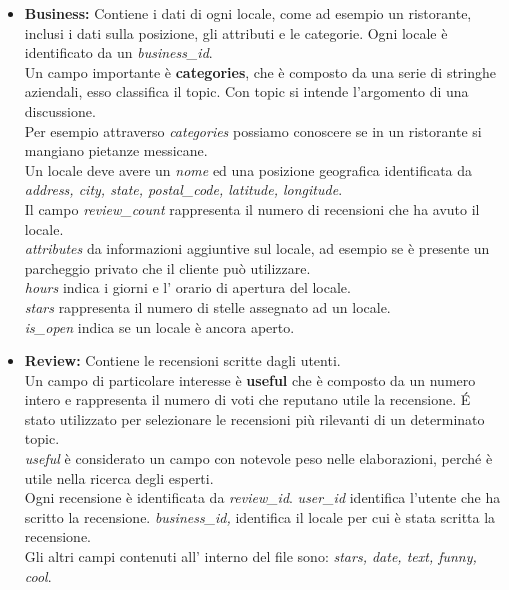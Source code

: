 \begin{itemize}
\item \textbf{Business:}
Contiene i dati di ogni locale, come ad esempio un ristorante, inclusi i dati sulla posizione, gli attributi e le categorie.
Ogni locale è identificato da un \textit{business\_id}.\\
Un campo importante è \textbf{categories}, che è composto da una serie di stringhe aziendali, esso classifica il topic. Con topic si intende l'argomento di una discussione.\\
Per esempio attraverso \textit{categories} possiamo conoscere se in un ristorante si mangiano pietanze messicane.\\
Un locale deve avere un \textit{nome} ed una posizione geografica identificata da \textit{address, city, state, postal\_code, latitude, longitude}.\\
Il campo \textit{review\_count} rappresenta il numero di recensioni che ha avuto il locale.\\
\textit{attributes} da informazioni aggiuntive sul locale, ad esempio se è presente un parcheggio privato che il cliente può utilizzare.\\
\textit{hours} indica i giorni e l' orario di apertura del locale.\\
\textit{stars} rappresenta il numero di stelle assegnato ad un locale.\\
\textit{is\_open } indica se un locale è ancora aperto.\\

\item \textbf{Review:}
Contiene le recensioni scritte dagli utenti.\\
Un campo di particolare interesse è \textbf{useful} che è composto da un numero intero e rappresenta il numero di voti che reputano utile la recensione. \'E stato utilizzato per selezionare le recensioni più rilevanti di un determinato topic.\\
\textit{useful} è considerato un campo con notevole peso nelle elaborazioni, perché è utile nella ricerca degli esperti.\\
Ogni recensione è identificata da \textit{review\_id}.
\textit{user\_id} identifica l'utente che ha scritto la recensione.
\textit{business\_id,} identifica il locale per cui è stata scritta la recensione.\\
Gli altri campi contenuti all' interno del file sono: \textit{stars, date, text, funny, cool}.\\


\end{itemize}

